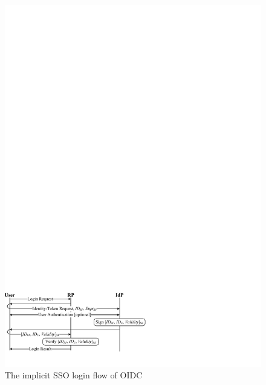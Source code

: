 \begin{figure}[t]
  \centering
  \includegraphics[width=0.98\linewidth]{fig/OIDC.pdf}
  \caption{The implicit SSO login flow of OIDC}
  \label{fig:OpenID}
\end{figure}

